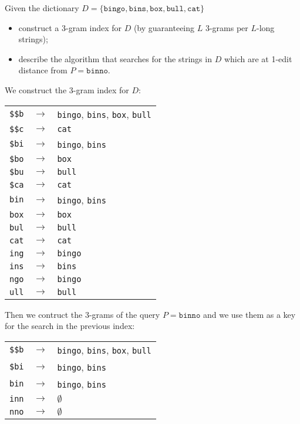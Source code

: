 \exercise

Given the dictionary $D = \{\texttt{bingo}, \texttt{bins}, \texttt{box},
\texttt{bull}, \texttt{cat}\}$
%
\begin{itemize}

  \item construct a 3-gram index for $D$ (by guaranteeing $L$ 3-grams per
  $L$-long strings);

  \item describe the algorithm that searches for the strings in $D$ which are at
  1-edit distance from $P = \texttt{binno}$.

\end{itemize}

\solution

We construct the 3-gram index for $D$:
%
  \begin{longtable}{ccl}
    \texttt{\$\$b} & $\rightarrow$ & \texttt{bingo}, \texttt{bins},
    \texttt{box}, \texttt{bull} \\
    \texttt{\$\$c} & $\rightarrow$ & \texttt{cat} \\
    \texttt{\$bi} & $\rightarrow$ & \texttt{bingo}, \texttt{bins} \\
    \texttt{\$bo} & $\rightarrow$ & \texttt{box} \\
    \texttt{\$bu} & $\rightarrow$ & \texttt{bull} \\
    \texttt{\$ca} & $\rightarrow$ & \texttt{cat} \\
    \texttt{bin} & $\rightarrow$ & \texttt{bingo}, \texttt{bins} \\
    \texttt{box} & $\rightarrow$ & \texttt{box} \\
    \texttt{bul} & $\rightarrow$ & \texttt{bull} \\
    \texttt{cat} & $\rightarrow$ & \texttt{cat} \\
    \texttt{ing} & $\rightarrow$ & \texttt{bingo} \\
    \texttt{ins} & $\rightarrow$ & \texttt{bins} \\
    \texttt{ngo} & $\rightarrow$ & \texttt{bingo} \\
    \texttt{ull} & $\rightarrow$ & \texttt{bull} \\
  \end{longtable}
%
Then we contruct the 3-grams of the query $P = \texttt{binno}$ and we use them
as a key for the search in the previous index:
%
\begin{table}[H]
  \centering
  \begin{tabular}{ccl}
    \texttt{\$\$b} & $\rightarrow$ & \texttt{bingo}, \texttt{bins},
    \texttt{box}, \texttt{bull} \\
    \texttt{\$bi} & $\rightarrow$ & \texttt{bingo}, \texttt{bins} \\
    \texttt{bin} & $\rightarrow$ & \texttt{bingo}, \texttt{bins} \\
    \texttt{inn} & $\rightarrow$ & $\emptyset$ \\
    \texttt{nno} & $\rightarrow$ & $\emptyset$ \\
  \end{tabular}
\end{table}
